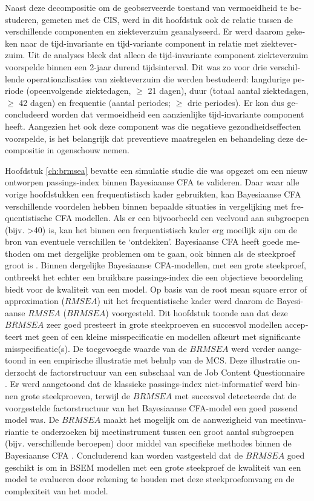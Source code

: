 \begin{otherlanguage}{dutch}
Naast deze decompositie om de geobserveerde toestand van vermoeidheid te bestuderen, gemeten met de CIS, werd in dit hoofdstuk ook de relatie tussen de verschillende componenten en ziekteverzuim geanalyseerd. Er werd daarom gekeken naar de tijd-invariante en tijd-variante component in relatie met ziekteverzuim. Uit de analyses bleek dat alleen de tijd-invariante component ziekteverzuim voorspelde binnen een 2-jaar durend tijdsinterval. Dit was zo voor drie verschillende operationalisaties van ziekteverzuim die werden bestudeerd: langdurige periode (opeenvolgende ziektedagen, $\geq$ 21 dagen), duur (totaal aantal ziektedagen, $\geq$ 42 dagen) en frequentie (aantal periodes; $\geq$ drie periodes). Er kon dus geconcludeerd worden dat vermoeidheid een aanzienlijke tijd-invariante component heeft. Aangezien het ook deze component was die negatieve gezondheidseffecten voorspelde, is het belangrijk dat preventieve maatregelen en behandeling deze decompositie in ogenschouw nemen.   

Hoofdstuk \ref{ch:brmsea} bevatte een simulatie studie die was opgezet om een nieuw ontworpen passings-index binnen Bayesiaanse CFA te valideren. Daar waar alle vorige hoofdstukken een frequentistisch kader gebruikten, kan Bayesiaanse CFA verschillende voordelen hebben binnen bepaalde situaties in vergelijking met frequentistische CFA modellen. Als er een bijvoorbeeld een veelvoud aan subgroepen (bijv. >40) is, kan het binnen een frequentistisch kader erg moeilijk zijn om de bron van eventuele verschillen te `ontdekken'. Bayesiaanse CFA heeft goede methoden om met dergelijke problemen om te gaan, ook binnen als de steekproef groot is \parencite{Schoot_2014}. Binnen dergelijke Bayesiaanse CFA-modellen, met een grote steekproef, ontbreekt het echter een bruikbare passings-index die een objectieve beoordeling biedt voor de kwaliteit van een model. Op basis van de root mean square error of approximation ($RMSEA$) uit het frequentistische kader werd daarom de Bayesiaanse $RMSEA$ ($BRMSEA$) voorgesteld. Dit hoofdstuk toonde aan dat deze $BRMSEA$ zeer goed presteert in grote steekproeven en succesvol modellen accepteert met geen of een kleine misspecificatie en modellen afkeurt met significante misspecificatie(s). De toegevoegde waarde van de $BRMSEA$ werd verder aangetoond in een empirische illustratie met behulp van de MCS. Deze illustratie onderzocht de factorstructuur van een subschaal van de Job Content Questionnaire \parencite{Karasek_1985}. Er werd aangetoond dat de klassieke passings-index niet-informatief werd binnen grote steekproeven, terwijl de $BRMSEA$ met succesvol detecteerde dat de voorgestelde factorstructuur van het Bayesiaanse CFA-model een goed passend model was. De $BRMSEA$ maakt het mogelijk om de aanwezigheid van meetinvariantie te onderzoeken bij meetinstrument tussen een groot aantal subgroepen (bijv. verschillende beroepen) door middel van specifieke methodes binnen de Bayesiaanse CFA \parencite{Schoot_2013a}. Concluderend kan worden vastgesteld dat de $BRMSEA$ goed geschikt is om in BSEM modellen met een grote steekproef de kwaliteit van een model te evalueren door rekening te houden met deze steekproefomvang en de complexiteit van het model.


\end{otherlanguage}
